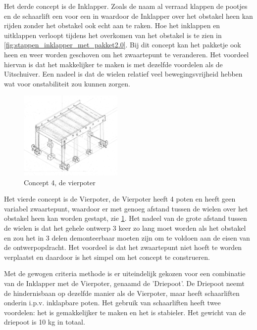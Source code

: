 Het derde concept is de Inklapper. Zoals de naam al verraad klappen de pootjes en de schaarlift een voor een in waardoor de Inklapper over het obstakel heen kan rijden zonder het obstakel ook echt aan te raken. Hoe het inklappen en uitklappen verloopt tijdens het overkomen van het obstakel is te zien in \cref{fig:stappen_inklapper_met_pakket2.0}. Bij dit concept kan het pakketje ook heen en weer worden geschoven om het zwaartepunt te veranderen. Het voordeel hiervan is dat het makkelijker te maken is met dezelfde voordelen als de Uitschuiver. Een nadeel is dat de wielen relatief veel bewegingsvrijheid hebben wat voor onstabiliteit zou kunnen zorgen. 

\begin{figure}
    \centering
    \includegraphics[width = 50mm]{04_idee_ontwikkeling/Foto_vierpoter.PNG}
    \caption{Concept 4, de vierpoter}
    \label{fig:vierpoter_totaal2.0}
\end{figure}

Het vierde concept is de Vierpoter, de Vierpoter heeft 4 poten en heeft geen variabel zwaartepunt, waardoor er met genoeg afstand tussen de wielen over het obstakel heen kan worden gestapt, zie \cref{fig:vierpoter_totaal2.0}. Het nadeel van de grote afstand tussen de wielen is dat het gehele ontwerp 3 keer zo lang moet worden als het obstakel en zou het in 3 delen demonteerbaar moeten zijn om te voldoen aan de eisen van de ontwerpopdracht. Het voordeel is dat het zwaartepunt niet hoeft te worden verplaatst en daardoor is het simpel om het concept te construeren.

\vspace{\baselineskip}
Met de gewogen criteria methode is er uiteindelijk gekozen voor een combinatie van de Inklapper met de Vierpoter, genaamd de 'Driepoot'. De Driepoot neemt de hindernisbaan op dezelfde manier als de Vierpoter, maar heeft schaarliften onderin i.p.v. inklapbare poten. Het gebruik van schaarliften heeft twee voordelen: het is gemakkelijker te maken en het is stabieler. Het gewicht van de driepoot is 10 kg in totaal.